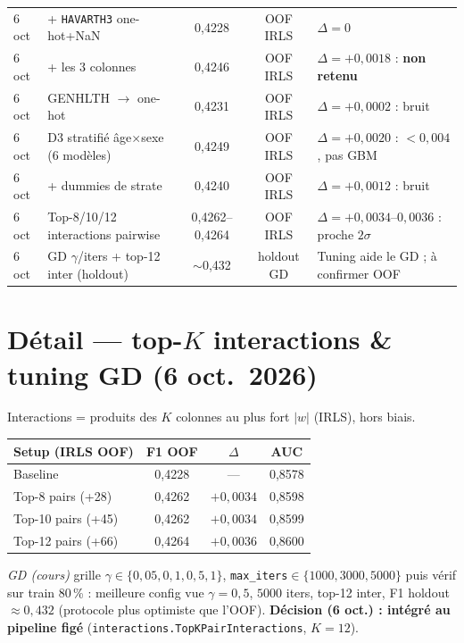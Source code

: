 \documentclass[11pt,a4paper]{article}
\begin{document}
\begin{longtable}{@{}p{2.4cm}p{5.0cm}ccp{3.8cm}@{}}
6 oct & + \texttt{HAVARTH3} one-hot+NaN & 0{,}4228 & OOF IRLS & $\Delta=0$ \\
6 oct & + les 3 colonnes & 0{,}4246 & OOF IRLS & $\Delta=+0{,}0018$ : \textbf{non retenu} \\
6 oct & GENHLTH $\to$ one-hot & 0{,}4231 & OOF IRLS & $\Delta=+0{,}0002$ : bruit \\
6 oct & D3 stratifié âge$\times$sexe (6 modèles) & 0{,}4249 & OOF IRLS & $\Delta=+0{,}0020$ : $<0{,}004$, pas GBM \\
6 oct & + dummies de strate & 0{,}4240 & OOF IRLS & $\Delta=+0{,}0012$ : bruit \\
6 oct & Top-8/10/12 interactions pairwise & 0{,}4262--0{,}4264 & OOF IRLS & $\Delta=+0{,}0034$--$0{,}0036$ : proche $2\sigma$ \\
6 oct & GD $\gamma$/iters + top-12 inter (holdout) & $\sim$0{,}432 & holdout GD & Tuning aide le GD ; à confirmer OOF \\
\bottomrule
\end{longtable}

\section{Détail --- top-$K$ interactions \& tuning GD (6 oct.\ 2026)}
Interactions = produits des $K$ colonnes au plus fort $|w|$ (IRLS), hors biais.

\begin{center}
\begin{tabular}{@{}lccc@{}}
\toprule
Setup (IRLS OOF) & F1 OOF & $\Delta$ & AUC \\
\midrule
Baseline & 0{,}4228 & --- & 0{,}8578 \\
Top-8 pairs (+28) & 0{,}4262 & $+0{,}0034$ & 0{,}8598 \\
Top-10 pairs (+45) & 0{,}4262 & $+0{,}0034$ & 0{,}8599 \\
Top-12 pairs (+66) & 0{,}4264 & $+0{,}0036$ & 0{,}8600 \\
\bottomrule
\end{tabular}
\end{center}

\noindent\textit{GD (cours)} grille $\gamma\in\{0{,}05,0{,}1,0{,}5,1\}$,
\texttt{max\_iters}$\in\{1000,3000,5000\}$ puis vérif sur train 80\,\% :
meilleure config vue $\gamma=0{,}5$, $5000$ iters, top-12 inter,
F1 holdout $\approx 0{,}432$ (protocole plus optimiste que l'OOF).
\textbf{Décision (6 oct.) : intégré au pipeline figé}
(\texttt{interactions.TopKPairInteractions}, $K=12$).
\end{document}
